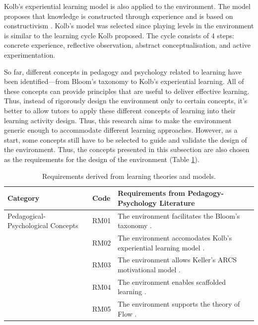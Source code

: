 \documentclass[12pt, a4paper]{report} \usepackage[titletoc]{appendix}
\begin{document}
Kolb's experiential learning model \cite{kolb2014experiential} is also applied to the environment. The model proposes that knowledge is constructed through experience and is based on constructivism \cite{kolb2014experiential}. Kolb's model was selected since playing levels in the environment is similar to the learning cycle Kolb proposed. The cycle consists of 4 steps: concrete experience, reflective observation, abstract conceptualisation, and active experimentation. 

So far, different concepts in pedagogy and psychology related to learning have been identified---from Bloom's taxonomy to Kolb's experiential learning. All of these concepts can provide principles that are useful to deliver effective learning. Thus, instead of rigorously design the environment only to certain concepts, it's better to allow tutors to apply these different concepts of learning into their learning activity design. Thus, this research aims to make the environment generic enough to accommodate different learning approaches. However, as a start, some concepts still have to be selected to guide and validate the design of the environment. Thus, the concepts presented in this subsection are also chosen as the requirements for the design of the environment (Table \ref{design-learning-models}).

\begin{table}[t!]
\caption{Requirements derived from learning theories and models.}
\label{design-learning-models}
\begin{center}
\begin{tabular}{ p{2.3cm}p{1cm}p{9.7cm} } 
\hline
Category & Code & Requirements from Pedagogy-Psychology Literature\\
\hline
\multirow{1}{2cm}{Pedagogical-Psychological Concepts} 
& RM01 & The environment facilitates the Bloom's taxonomy \cite{krathwohl2002revision}. \\
& RM02 & The environment accomodates Kolb's experiential learning model \cite{kolb2014experiential}. \\ 
& RM03 & The environment allows Keller's ARCS motivational model \cite{keller2010motivational}. \\
& RM04 & The environment enables scaffolded learning \cite{vygotsky1978mind, wood1976role}. \\
& RM05 & The environment supports the theory of Flow \cite{csikszentmihalyi2014toward}. \\ 
\hline
\end{tabular}
\end{center}
\end{table}
\end{document}

